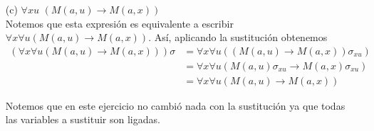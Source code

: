 \documentclass[letterpaper,11pt]{article}
\begin{document}
\begin{enumerate}
\begin{itemize}
\begin{enumerate}
\begin{itemize}
                    \item[(c)] $\forall xu$ $(M(a,u) \rightarrow M(a,x))$ \\
                    Notemos que esta expresión es equivalente a escribir 
                    $\forall x \forall u (M(a,u) \rightarrow M(a,x))$. Así, 
                    aplicando la sustitución obtenemos   
                    \begin{align*}
                        (\forall x \forall u (M(a,u) 
                        \rightarrow M(a,x))) \sigma
                        &= \forall x \forall u ((M(a,u) 
                        \rightarrow M(a,x)) \sigma_{xu}) \\
                        &= \forall x \forall u (M(a,u) \sigma_{xu} 
                        \rightarrow M(a,x) \sigma_{xu}) \\
                        &= \forall x \forall u (M(a,u) \rightarrow M(a,x))
                    \end{align*}

                    Notemos que en este ejercicio no cambió nada con la 
                    sustitución ya que todas las variables a sustituir son 
                    ligadas. 

                \end{itemize}

            \end{enumerate}

        \end{itemize}
        
    \end{enumerate}
\end{document}
